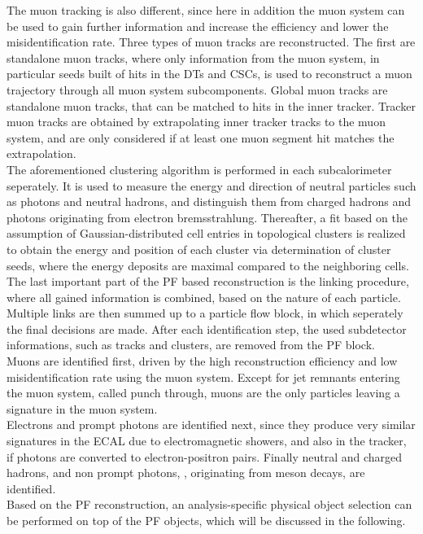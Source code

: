 The muon tracking is also different, since here in addition the muon system can be used to gain further information and increase the efficiency and lower the misidentification rate. Three types of muon tracks are reconstructed. The first are standalone muon tracks, where only information from the muon system, in particular seeds built of hits in the DTs and CSCs, is used to reconstruct a muon trajectory through all muon system subcomponents. Global muon tracks are standalone muon tracks, that can be matched to hits in the inner tracker. Tracker muon tracks are obtained by extrapolating inner tracker tracks to the muon system, and are only considered if at least one muon segment hit matches the extrapolation.\\
The aforementioned clustering algorithm is performed in each subcalorimeter seperately. It is used to measure the energy and direction of neutral particles such as photons and neutral hadrons, and distinguish them from charged hadrons and photons originating from electron bremsstrahlung. Thereafter, a fit based on the assumption of Gaussian-distributed cell entries in topological clusters is realized to obtain the energy and position of each cluster via determination of cluster seeds, where the energy deposits are maximal compared to the neighboring cells.\\
The last important part of the PF based reconstruction is the linking procedure, where all gained information is combined, based on the nature of each particle. Multiple links are then summed up to a particle flow block, in which seperately the final decisions are made. After each identification step, the used subdetector informations, such as tracks and clusters, are removed from the PF block.\\
Muons are identified first, driven by the high reconstruction efficiency and low misidentification rate using the muon system. Except for jet remnants entering the muon system, called punch through, muons are the only particles leaving a signature in the muon system.\\
Electrons and prompt photons are identified next, since they produce very similar signatures in the ECAL due to electromagnetic showers, and also in the tracker, if photons are converted to electron-positron pairs. Finally neutral and charged hadrons, and non prompt photons, \eg, originating from meson decays, are identified.\\
Based on the PF reconstruction, an analysis-specific physical object selection can be performed on top of the PF objects, which will be discussed in the following.
















